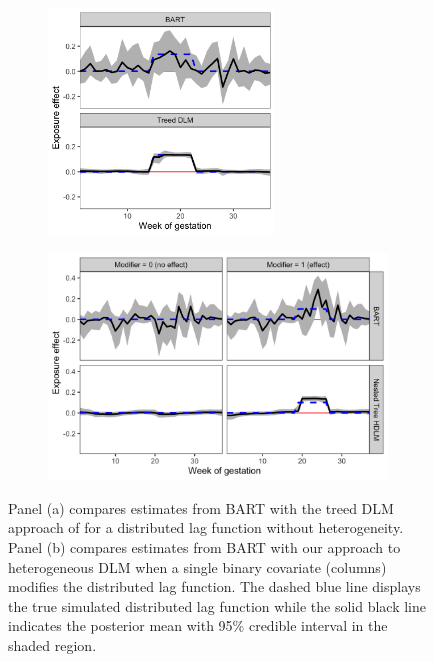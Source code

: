\documentclass[12pt]{article}
\begin{document}
\begin{figure}[!ht]
    \centering
    \begin{subfigure}{0.39\textwidth}
        \centering
        \includegraphics[height=6cm]{img/bart_vs_tdlm.png}
        \caption{}
        \label{fig:bart_vs_tdlm}
    \end{subfigure}
    \begin{subfigure}{0.59\textwidth}
        \centering
        \includegraphics[height=6cm]{img/bart_vs_hdlm.png}
        \caption{}
        \label{fig:bart_vs_hdlm}
    \end{subfigure}
    \caption{Panel (a) compares estimates from BART with the treed DLM approach of \cite{Mork2022EstimatingPairs} for a distributed lag function without heterogeneity. Panel (b) compares estimates from BART with our approach to heterogeneous DLM when a single binary covariate (columns) modifies the distributed lag function. The dashed blue line displays the true simulated distributed lag function while the solid black line indicates the posterior mean with 95\% credible interval in the shaded region.}
    \label{fig:scen4_5}
\end{figure}
\end{document}
